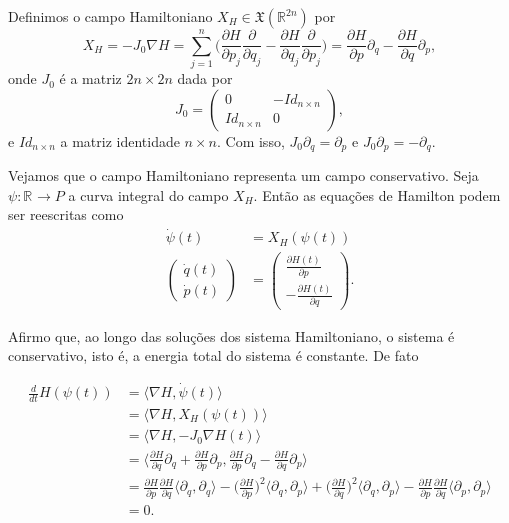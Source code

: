 \documentclass[12pt]{book}
\newcommand{\bigparenteses}[1]{\Big( #1 \Big) }
\newcommand{\campohamiltoniano}[1]{X_{H}(#1)}
\newcommand{\campohamiltonianoabrev}{X_{H}}
\newcommand{\campossuaves}[1]{\mathfrak{X}(#1)}
\newcommand{\derivada}[2]{\frac{d #1}{d #2}}
\newcommand{\derivadaparcial}[2]{\frac{\partial #1}{\partial #2}}
\newcommand{\derivadaparcialabrev}[1]{\partial_{#1}}
\newcommand{\estruturacomplexa}{J_{0}}
\newcommand{\produtointerno}[2]{\langle #1, #2 \rangle}
\newcommand{\real}[1]{\mathbb{R}^{#1}}
\newcommand{\reta}{\real{}}
\begin{document}
	Definimos o campo Hamiltoniano $\campohamiltonianoabrev \in \campossuaves{\real{2n}}$ por 
	$$
	\campohamiltonianoabrev = -\estruturacomplexa \nabla H = \sum_{j=1}^{n}\bigparenteses{\derivadaparcial{H}{p_{j}}\derivadaparcial{}{q_{j}} - \derivadaparcial{H}{q_{j}}\derivadaparcial{}{p_{j}} } = \derivadaparcial{H}{p}\derivadaparcialabrev{q} - \derivadaparcial{H}{q}\derivadaparcialabrev{p}, 
	$$
	onde $\estruturacomplexa$ é a matriz $2n \times 2n$ dada por
	$$
	\estruturacomplexa=
	\left(
	\begin{array}{cc}
	0 & -Id_{n\times n}
	\\
	Id_{n\times n} & 0
	\end{array}
	\right), 
	$$
	e $Id_{n\times n}$ a matriz identidade $n\times n$. Com isso, $\estruturacomplexa \derivadaparcialabrev{q} = \derivadaparcialabrev{p}$ e $\estruturacomplexa \derivadaparcialabrev{p} = -\derivadaparcialabrev{q}$.
	
	Vejamos que o campo Hamiltoniano representa um campo conservativo. Seja $\psi:\reta \to P$ a curva integral do campo $\campohamiltonianoabrev$. Então as equações de Hamilton podem ser reescritas como 
	$$
	\begin{aligned}
	\dot{\psi}(t) &= \campohamiltoniano{\psi(t)}
	\\
	\left(
	\begin{array}{c}
	\dot{q}(t)
	\\
	\dot{p}(t)
	\end{array}
	\right)
	&=
	\left(
	\begin{array}{c}
	\derivadaparcial{H(t)}{p}
	\\
	-\derivadaparcial{H(t)}{q}
	\end{array}
	\right).
	\end{aligned}
	$$	
	
	Afirmo que, ao longo das soluções dos sistema Hamiltoniano, o sistema é conservativo, isto é, a energia total do sistema é constante. De fato
	
	$$
	\begin{aligned}
	\derivada{}{t}H(\psi(t)) 
	&= \produtointerno{\nabla H}{\dot{\psi}(t)} 
	\\
	&= \produtointerno{\nabla H}{\campohamiltoniano{\psi(t)}} 
	\\
	&= 
	\produtointerno{\nabla H}{-\estruturacomplexa \nabla H(t)} 
	\\
	&=\produtointerno{\derivadaparcial{H}{q}\derivadaparcialabrev{q} + \derivadaparcial{H}{p}\derivadaparcialabrev{p}
	}{\derivadaparcial{H}{p}\derivadaparcialabrev{q} - \derivadaparcial{H}{q}\derivadaparcialabrev{p}}
	\\
	&=\derivadaparcial{H}{p}\derivadaparcial{H}{q}\produtointerno{\derivadaparcialabrev{q}}{\derivadaparcialabrev{q}}-\bigparenteses{\derivadaparcial{H}{p}}^{2}\produtointerno{\derivadaparcialabrev{q}
	}{\derivadaparcialabrev{p}}	
	+\bigparenteses{\derivadaparcial{H}{q}}^{2}\produtointerno{\derivadaparcialabrev{q}}{\derivadaparcialabrev{p}}
	-\derivadaparcial{H}{p}\derivadaparcial{H}{q}\produtointerno{\derivadaparcialabrev{p}}{\derivadaparcialabrev{p}}
	\\
	&=0.
	\end{aligned}
	$$
	
\end{document}
